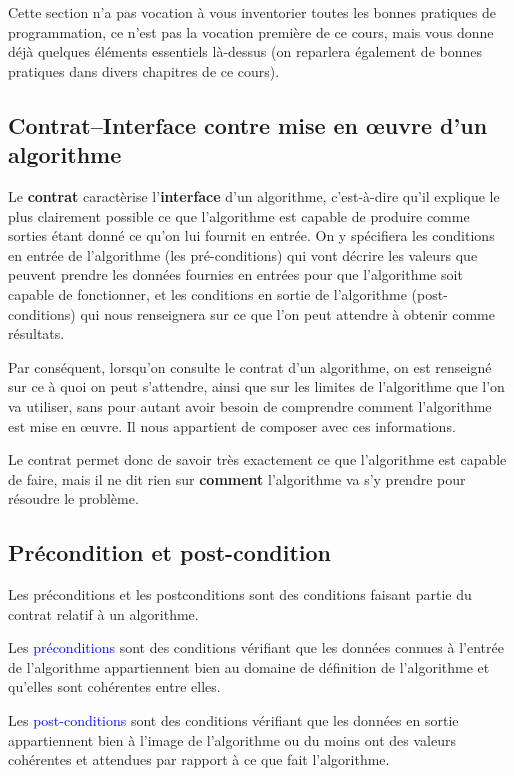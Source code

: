 Cette section n'a pas vocation à vous inventorier toutes les bonnes pratiques de programmation, ce n'est pas la vocation première de ce cours, mais vous donne déjà quelques éléments essentiels là-dessus (on reparlera également de bonnes pratiques dans divers chapitres de ce cours).

\subsection{Contrat--Interface contre mise en {\oe}uvre d'un algorithme}

Le \textbf{contrat} caractèrise l'\textbf{interface} d'un algorithme, c'est-à-dire qu'il explique le plus clairement possible ce que l'algorithme est capable de produire comme sorties étant donné ce qu'on lui fournit en entrée. On y spécifiera les conditions en entrée de l'algorithme (les pré-conditions) qui vont décrire les valeurs que peuvent prendre les données fournies en entrées pour que l'algorithme soit capable de fonctionner, et les conditions en sortie de l'algorithme (post-conditions) qui nous renseignera sur ce que l'on peut attendre à obtenir comme résultats.

Par conséquent, lorsqu'on consulte le contrat d'un algorithme, on est renseigné sur ce à quoi on peut s'attendre, ainsi que sur les limites de l'algorithme que l'on va utiliser, sans pour autant avoir besoin de comprendre comment l'algorithme est mise en {\oe}uvre. Il nous appartient de composer avec ces informations.

Le contrat permet donc de savoir très exactement ce que l'algorithme est capable de faire, mais il ne dit rien sur \textbf{comment} l'algorithme va s'y prendre pour résoudre le problème.

\subsection{Précondition et post-condition}

Les préconditions et les postconditions sont des conditions faisant partie du contrat relatif à un algorithme.

Les \textcolor{blue}{préconditions} sont des conditions vérifiant que les données connues à l'entrée de l'algorithme appartiennent bien au domaine de définition de l'algorithme et qu'elles sont cohérentes entre elles.

Les \textcolor{blue}{post-conditions} sont des conditions vérifiant que les données en sortie appartiennent bien à l'image de l'algorithme ou du moins ont des valeurs cohérentes et attendues par rapport à ce que fait l'algorithme.


